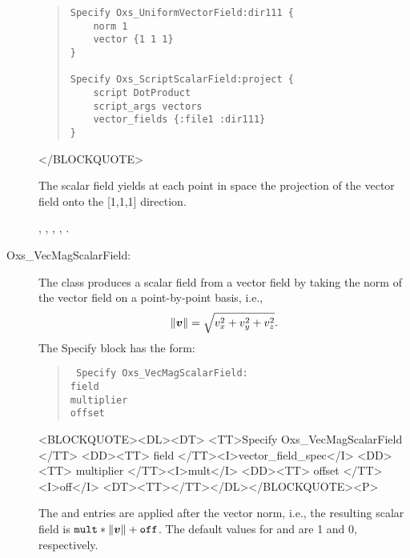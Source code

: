 \begin{description}
\begin{quote}
\begin{verbatim}
Specify Oxs_UniformVectorField:dir111 {
    norm 1
    vector {1 1 1}
}

Specify Oxs_ScriptScalarField:project {
    script DotProduct
    script_args vectors
    vector_fields {:file1 :dir111}
}
\end{verbatim}
\end{quote}
\begin{rawhtml}
</BLOCKQUOTE>
\end{rawhtml}
The scalar field  yields at each point in space the
projection of the vector field  onto the [1,1,1] direction.

\begin{ExampleMifs}
  , ,
  , ,
  .
\end{ExampleMifs}

\item[Oxs\_VecMagScalarField:]
%
The  class produces a scalar field
from a vector field by taking the norm of the vector field on a
point-by-point basis, i.e.,
\begin{displaymath}
   \|\mbox{\boldmath $v$}\| = \sqrt{v_x^2+v_y^2+v_z^2}.
\end{displaymath}
The Specify block has the form:
\begin{latexonly}
\begin{quote}\tt
Specify Oxs\_VecMagScalarField: \ocb\\
 \bi field \\
 \bi multiplier \\
 \bi offset \\
\ccb
\end{quote}
\end{latexonly}
\begin{rawhtml}
<BLOCKQUOTE><DL><DT>
<TT>Specify Oxs_VecMagScalarField {</TT>
<DD><TT> field </TT><I>vector_field_spec</I>
<DD><TT> multiplier </TT><I>mult</I>
<DD><TT> offset </TT><I>off</I>
<DT><TT>}</TT></DL></BLOCKQUOTE><P>
\end{rawhtml}
The  and  entries are applied
after the vector norm, i.e., the resulting scalar field is
$\texttt{mult}\ast\|\mbox{\boldmath $v$}\|+\texttt{off}$.  The default values
for  and  are 1 and 0, respectively.


\end{description}
